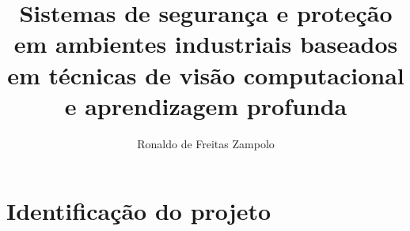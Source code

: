 

\title{Sistemas de segurança e proteção em ambientes industriais baseados em técnicas de visão computacional e aprendizagem profunda}

\author[1]{Ronaldo de Freitas Zampolo}




\maketitle
\newpage\tableofcontents\newpage

\section{Identificação do projeto}

